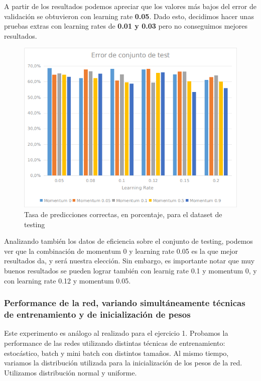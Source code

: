 A partir de los resultados podemos apreciar que los valores más bajos del error de validación se obtuvieron con learning rate \textbf{0.05}. Dado esto,
decidimos hacer unas pruebas extras con learning rates de \textbf{0.01 y 0.03} pero no conseguimos mejores resultados. 

\begin{figure}[!htbp]
  \begin{center}
  \includegraphics[scale=1]{graficos/ej2/error_testing_eta_x_momentum.png}
  \caption{Tasa de predicciones correctas, en porcentaje, para el dataset de testing}
  \end{center}
\end{figure}

Analizando también los datos de eficiencia sobre el conjunto de testing, podemos ver que la combinación de momentum 0 y learning rate 0.05 es la que 
mejor resultados da, y será nuestra elección. Sin embargo, es importante notar que muy buenos resultados se pueden lograr también con learnig rate 
0.1 y momentum 0, y con learning rate 0.12 y momentum 0.05.

\subsubsection{Performance de la red, variando simultáneamente técnicas de entrenamiento y de inicialización de pesos}

Este experimento es análogo al realizado para el ejercicio 1. Probamos la performance de las redes utilizando
distintas técnicas de entrenamiento: estocástico, batch y mini batch con distintos tamaños. Al mismo tiempo, variamos 
la distribución utilizada para la inicialización de los pesos de la red. Utilizamos distribución normal y uniforme.\\

